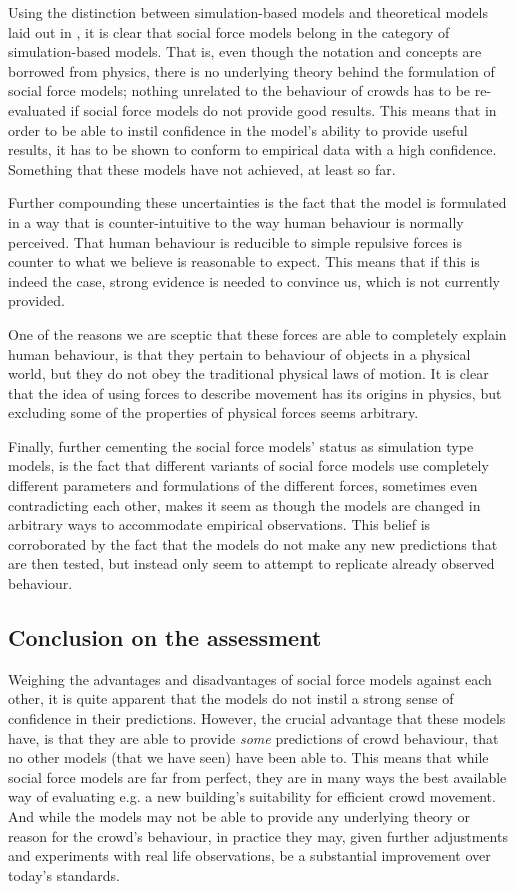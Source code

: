 Using the distinction between simulation-based models and theoretical models 
laid out in \cite{imfufa-tekst}, it is clear that social force models belong 
in the category of simulation-based models. That is, even though the notation 
and concepts are borrowed from physics, there is no underlying theory behind 
the formulation of social force models; nothing unrelated to the behaviour of 
crowds has to be re-evaluated if social force models do not provide good 
results. This means that in order to be able to instil confidence in the 
model's ability to provide useful results, it has to be shown to conform to 
empirical data with a high confidence. Something that these models have not 
achieved, at least so far.

Further compounding these uncertainties is the fact that the model is 
formulated in a way that is counter-intuitive to the way human behaviour is 
normally perceived. That human behaviour is reducible to simple repulsive 
forces is counter to what we believe is reasonable to expect. This means that 
if this is indeed the case, strong evidence is needed to convince us, which is 
not currently provided.

One of the reasons we are sceptic that these forces are able to completely 
explain human behaviour, is that they pertain to behaviour of objects in a 
physical world, but they do not obey the traditional physical laws of motion.  
It is clear that the idea of using forces to describe movement has its origins 
in physics, but excluding some of the properties of physical forces seems 
arbitrary.

Finally, further cementing the social force models' status as simulation type 
models, is the fact that different variants of social force models use 
completely different parameters and formulations of the different forces, 
sometimes even contradicting each other, makes it seem as though the models 
are changed in arbitrary ways to accommodate empirical observations. This 
belief is corroborated by the fact that the models do not make any new 
predictions that are then tested, but instead only seem to attempt to 
replicate already observed behaviour.

\subsection{Conclusion on the assessment}
Weighing the advantages and disadvantages of social force models against each 
other, it is quite apparent that the models do not instil a strong sense of 
confidence in their predictions. However, the crucial advantage that these 
models have, is that they are able to provide \emph{some} predictions of crowd 
behaviour, that no other models (that we have seen) have been able to. This 
means that while social force models are far from perfect, they are in many 
ways the best available way of evaluating e.g. a new building's suitability 
for efficient crowd movement. And while the models may not be able to provide 
any underlying theory or reason for the crowd's behaviour, in practice they 
may, given further adjustments and experiments with real life observations, be 
a substantial improvement over today's standards.
